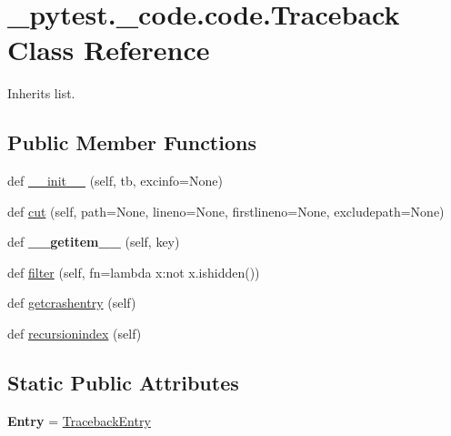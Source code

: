 \hypertarget{class__pytest_1_1__code_1_1code_1_1_traceback}{}\section{\+\_\+pytest.\+\_\+code.\+code.\+Traceback Class Reference}
\label{class__pytest_1_1__code_1_1code_1_1_traceback}


Inherits list.

\subsection*{Public Member Functions}
\begin{DoxyCompactItemize}
\item 
def \hyperlink{class__pytest_1_1__code_1_1code_1_1_traceback_a10c70617f1844bc6651929956d3d2bac}{\+\_\+\+\_\+init\+\_\+\+\_\+} (self, tb, excinfo=None)
\item 
def \hyperlink{class__pytest_1_1__code_1_1code_1_1_traceback_a52d37e5e48af0efad4340a6be1b906f2}{cut} (self, path=None, lineno=None, firstlineno=None, excludepath=None)
\item 
\mbox{\label{class__pytest_1_1__code_1_1code_1_1_traceback_ab137410e84a38eedd3d9caf79286899d}} 
def {\bfseries \+\_\+\+\_\+getitem\+\_\+\+\_\+} (self, key)
\item 
def \hyperlink{class__pytest_1_1__code_1_1code_1_1_traceback_a60858123598ead711a5b6ca046a21c0a}{filter} (self, fn=lambda x\+:not x.\+ishidden())
\item 
def \hyperlink{class__pytest_1_1__code_1_1code_1_1_traceback_ab8f83d3614989f22fcd2ec680554d516}{getcrashentry} (self)
\item 
def \hyperlink{class__pytest_1_1__code_1_1code_1_1_traceback_a22bcd0c12c4313b424601ec1e4d1a7df}{recursionindex} (self)
\end{DoxyCompactItemize}
\subsection*{Static Public Attributes}
\begin{DoxyCompactItemize}
\item 
\mbox{\label{class__pytest_1_1__code_1_1code_1_1_traceback_a9d13b25d16aac7e3ff17f69d46715cb7}} 
{\bfseries Entry} = \hyperlink{class__pytest_1_1__code_1_1code_1_1_traceback_entry}{Traceback\+Entry}
\end{DoxyCompactItemize}


